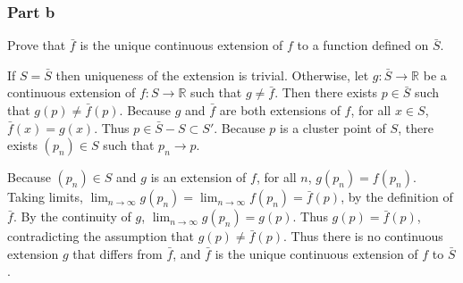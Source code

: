 \documentclass{article}
\newcommand{\R}{\mathbb{R}}
\begin{document}
\subsubsection*{Part b}

Prove that $\bar{f}$ is the unique continuous extension of $f$ to a function defined on $\bar{S}$.

If $S = \bar{S}$ then uniqueness of the extension is trivial. Otherwise, let $g: \bar{S} \rightarrow \R$ be a continuous extension of $f: S \rightarrow \R$ such that $g \neq \bar{f}$. Then there exists $p \in \bar{S}$ such that $g(p) \neq \bar{f}(p)$. Because $g$ and $\bar{f}$ are both extensions of $f$, for all $x \in S$, $\bar{f}(x) = g(x)$. Thus $p \in \bar{S} - S \subset S'$. Because $p$ is a cluster point of $S$, there exists $(p_n) \in S$ such that $p_n \rightarrow p$.

Because $(p_n) \in S$ and $g$ is an extension of $f$, for all $n$, $g(p_n) = f(p_n)$. Taking limits, $\lim_{n \rightarrow \infty} g(p_n) = \lim_{n \rightarrow \infty} f(p_n) = \bar{f}(p)$, by the definition of $\bar{f}$. By the continuity of $g$, $\lim_{n \rightarrow \infty} g(p_n) = g(p)$. Thus $g(p) = \bar{f}(p)$, contradicting the assumption that $g(p) \neq \bar{f}(p)$. Thus there is no continuous extension $g$ that differs from $\bar{f}$, and $\bar{f}$ is the unique continuous extension of $f$ to $\bar{S}$.
\end{document}
